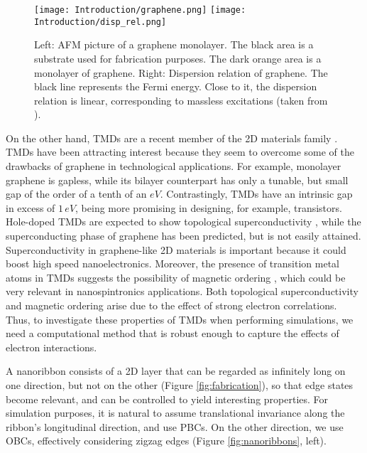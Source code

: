 \begin{figure}[H]
\hspace{1cm}
\texttt{[image: Introduction/graphene.png]}
\hspace{2cm}
\texttt{[image: Introduction/disp\_rel.png]}
\caption[Graphene monolayer; graphene's dispersion relation.]{Left: \acf{AFM} picture of a graphene monolayer. The black area is a substrate used for fabrication purposes. The dark orange area is a monolayer of graphene. Right: Dispersion relation of graphene. The black line represents the Fermi energy. Close to it, the dispersion relation is linear, corresponding to massless excitations (taken from \cite{noauthor_nobel_nodate}). }
\label{fig:graphene}
\end{figure}	

On the other hand, \acp{TMD} are a recent member of the \ac{2D} materials family \cite{wang_electronics_2012, roldan_electronic_2014, xu_spin_2014}.
\acp{TMD} have been attracting interest because they seem to overcome some of the drawbacks of graphene in technological applications.
For example, monolayer graphene is gapless, while its bilayer counterpart has only a tunable, but small gap of the order of a tenth of an $eV$.
Contrastingly, \acp{TMD} have an intrinsic gap in excess of $1 \, eV$, being more promising in designing, for example, transistors.
Hole-doped \acp{TMD} are expected to show topological superconductivity \cite{hsu_topological_2017}, while the superconducting phase of graphene has been predicted, but is not easily attained.
Superconductivity in graphene-like \ac{2D} materials is important because it could boost high speed nanoelectronics.
Moreover, the presence of transition metal atoms in \acp{TMD} suggests the possibility of magnetic ordering \cite{braz_valley_2017}, which could be very relevant in nanospintronics applications.
Both topological superconductivity and magnetic ordering arise due to the effect of strong electron correlations.
Thus, to investigate these properties of \acp{TMD} when performing simulations, we need a computational method that is robust enough to capture the effects of electron interactions.

A nanoribbon consists of a \ac{2D} layer that can be regarded as infinitely long on one direction, but not on the other (Figure \ref{fig:fabrication}), so that edge states become relevant, and can be controlled to yield interesting properties.
For simulation purposes, it is natural to assume translational invariance along the ribbon's longitudinal direction, and use \acp{PBC}.
On the other direction, we use \acp{OBC}, effectively considering zigzag edges (Figure \ref{fig:nanoribbons}, left).


